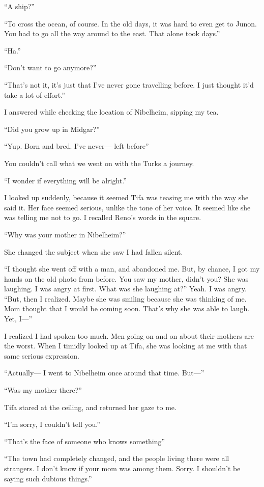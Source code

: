 \documentclass[oneside]{book}
\begin{document}
“A ship?”

“To cross the ocean, of course. In the old days, it was hard to even get to Junon. You had to go all the way around to the east. That alone took days.”

“Ha.”

“Don’t want to go anymore?”

“That’s not it, it’s just that I’ve never gone travelling before. I just thought it’d take a lot of effort.”

I answered while checking the location of Nibelheim, sipping my tea.

“Did you grow up in Midgar?”

“Yup. Born and bred. I’ve never— left before”

You couldn’t call what we went on with the Turks a journey.

“I wonder if everything will be alright.”

I looked up suddenly, because it seemed Tifa was teasing me with the way she said it. Her face seemed serious, unlike the tone of her voice. It seemed like she was telling me not to go. I recalled Reno’s words in the square.

“Why was your mother in Nibelheim?”

She changed the subject when she saw I had fallen silent.

“I thought she went off with a man, and abandoned me. But, by chance, I got my hands on the old photo from before. You saw my mother, didn’t you? She was laughing. I was angry at first. What was she laughing at?” Yeah. I was angry. “But, then I realized. Maybe she was smiling because she was thinking of me. Mom thought that I would be coming soon. That’s why she was able to laugh. Yet, I—”

I realized I had spoken too much. Men going on and on about their mothers are the worst. When I timidly looked up at Tifa, she was looking at me with that same serious expression.

“Actually— I went to Nibelheim once around that time. But—”

“Was my mother there?”

Tifa stared at the ceiling, and returned her gaze to me.

“I’m sorry, I couldn’t tell you.”

“That’s the face of someone who knows something”

“The town had completely changed, and the people living there were all strangers. I don’t know if your mom was among them. Sorry. I shouldn’t be saying such dubious things.”
\end{document}
